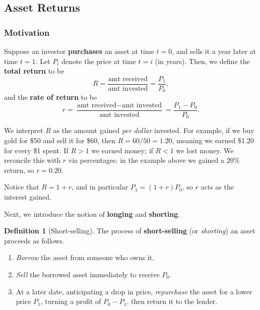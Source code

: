 \documentclass[12pt, a4paper]{article}
\theoremstyle{plain}
\theoremstyle{definition}
\newtheorem{definition}[theorem]{Definition}
\theoremstyle{remark}
\newenvironment{sidenote}{%
  \par\vspace{0.5em}%
  \noindent\color{defcolor}%
}{%
  \par\vspace{0.5em}%
  \color{black}%
}
\begin{document}
\subsection{Asset Returns}

\subsubsection*{Motivation}

Suppose an investor \textbf{purchases} an asset at time $t=0$, and sells it a year later at time $t=1$. Let $P_i$ denote the price at time $t=i$ (in years). Then, we define the \textbf{total return} to be
\[
  R = \frac{\text{amt received}}{\text{amt invested}} = \frac{P_1}{P_0},
\]
and the \textbf{rate of return} to be
\[
  r = \frac{\text{amt received} - \text{amt invested}}{\text{amt invested}} = \frac{P_1 - P_0}{P_0}.
\]

\begin{sidenote}
  We interpret $R$ as the amount gained \emph{per dollar} invested. For example, if we buy gold for \$50 and sell it for \$60, then $R = 60/50 = 1.20$, meaning we earned \$1.20 for every \$1 spent. If $R > 1$ we earned money; if $R < 1$ we lost money. We reconcile this with $r$ via percentages: in the example above we gained a $20\%$ return, so $r = 0.20$.
\end{sidenote}

\medskip \noindent Notice that $R = 1 + r$, and in particular $P_1 = (1+r)P_0$, so $r$ acts as the interest gained.

Next, we introduce the notion of \textbf{longing} and \textbf{shorting}.

\begin{definition}[Short-selling]
  The process of \textbf{short-selling} (or \emph{shorting}) an asset proceeds as follows.
  \begin{enumerate}
    \item \emph{Borrow} the asset from someone who owns it.
    \item \emph{Sell} the borrowed asset immediately to receive $P_0$.
    \item At a later date, anticipating a drop in price, \emph{repurchase} the asset for a lower price $P_1$, turning a profit of $P_0 - P_1$, then return it to the lender.
  \end{enumerate}
\end{definition}
\end{document}
